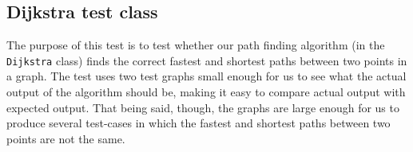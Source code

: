 \subsection{Dijkstra test class}
The purpose of this test is to test whether our path finding algorithm (in the \texttt{Dijkstra} class) finds the correct fastest and shortest paths between two points in a graph. The test uses two test graphs small enough for us to see what the actual output of the algorithm should be, making it easy to compare actual output with expected output. That being said, though, the graphs are large enough for us to produce several test-cases in which the fastest and shortest paths between two points are not the same. \\
